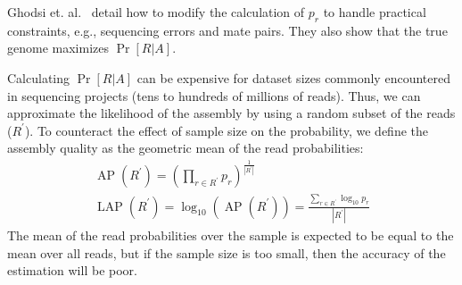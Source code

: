 Ghodsi et. al.~\cite{LAP} detail how to modify the calculation of $p_r$ to handle practical constraints, e.g., sequencing errors and mate pairs.
They also show that the true genome maximizes $\Pr[R|A]$.

Calculating $\Pr[R|A]$ can be expensive for dataset sizes commonly encountered in sequencing projects (tens to hundreds of millions of reads).
Thus, we can approximate the likelihood of the assembly by using a random subset of the reads ($R^\prime$).
To counteract the effect of sample size on the probability, we define the assembly quality as the geometric mean of the read probabilities:
%
\begin{align}
\label{average_log_probability}
  \operatorname{AP}(R^\prime) =
  \left(\prod_{r \in R^\prime} p_r\right)^{\frac{1}{\left|R^\prime\right|}} \nonumber  \\
  \operatorname{LAP}(R^\prime) = \log_{10} \left( \operatorname{AP}(R^\prime) \right) = \frac{\sum_{r \in R^\prime} \log_{10} p_r}{\left|R^\prime\right|}
\end{align}
%
The mean of the read probabilities over the sample is expected to be equal to the mean over all reads, but if the sample size is too small, then the accuracy of the estimation will be poor.

